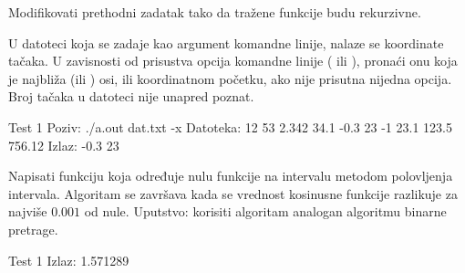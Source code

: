 \begin{Exercise}[label=404]
  Modifikovati prethodni zadatak tako da tražene funkcije budu
  rekurzivne.
\end{Exercise}

\begin{Exercise}[label=405]
  U datoteci koja se zadaje kao argument komandne linije, nalaze se
  koordinate tačaka. U zavisnosti od prisustva opcija komandne linije
  ( ili ), pronaći onu koja je najbliža 
  (ili ) osi, ili koordinatnom početku, ako nije prisutna
  nijedna opcija. Broj tačaka u datoteci nije unapred poznat.
  
\begin{miditest}
\begin{test}{Test 1}
Poziv: ./a.out dat.txt -x
Datoteka:
12 53
2.342 34.1
-0.3 23
-1 23.1
123.5 756.12
Izlaz: -0.3 23
\end{test}
\end{miditest}
  
\end{Exercise}

\begin{Exercise}[label=406]
  Napisati funkciju koja određuje nulu funkcije  na
  intervalu \argf{[0,2]} metodom polovljenja intervala. Algoritam se završava kada se
  vrednost kosinusne funkcije razlikuje za najviše $0.001$ od nule. Uputstvo: korisiti algoritam analogan algoritmu binarne pretrage.
  
  
\begin{minitest}
\begin{test}{Test 1}
Izlaz:
1.571289
\end{test}
\end{minitest}
  
\end{Exercise}

